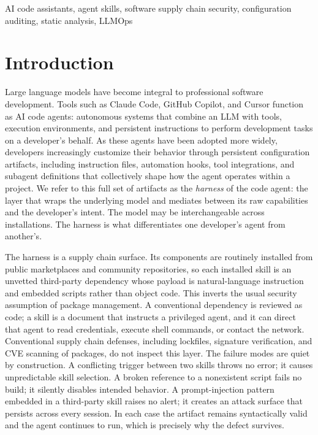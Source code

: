 \documentclass[conference]{IEEEtran}
\begin{document}
\begin{IEEEkeywords}
AI code assistants, agent skills, software supply chain security, configuration
auditing, static analysis, LLMOps
\end{IEEEkeywords}

\section{Introduction}

Large language models have become integral to professional software
development. Tools such as Claude Code, GitHub Copilot, and Cursor function as
AI code agents: autonomous systems that combine an LLM with tools, execution
environments, and persistent instructions to perform development tasks on a
developer's behalf. As these agents have been adopted more widely, developers
increasingly customize their behavior through persistent configuration
artifacts, including instruction files, automation hooks, tool integrations, and
subagent definitions that collectively shape how the agent operates within a
project. We refer to this full set of artifacts as the \emph{harness} of the
code agent: the layer that wraps the underlying model and mediates between its
raw capabilities and the developer's intent. The model may be interchangeable
across installations. The harness is what differentiates one developer's agent
from another's.

The harness is a supply chain surface. Its components are routinely installed
from public marketplaces and community repositories, so each installed skill is
an unvetted third-party dependency whose payload is natural-language instruction
and embedded scripts rather than object code. This inverts the usual security
assumption of package management. A conventional dependency is reviewed as code;
a skill is a document that instructs a privileged agent, and it can direct that
agent to read credentials, execute shell commands, or contact the network.
Conventional supply chain defenses, including lockfiles, signature verification,
and CVE scanning of packages, do not inspect this layer. The failure modes are
quiet by construction. A conflicting trigger between two skills throws no error;
it causes unpredictable skill selection. A broken reference to a nonexistent
script fails no build; it silently disables intended behavior. A
prompt-injection pattern embedded in a third-party skill raises no alert; it
creates an attack surface that persists across every session. In each case the
artifact remains syntactically valid and the agent continues to run, which is
precisely why the defect survives.
\end{document}
